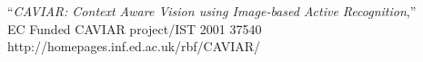 \begin{thebibliography}{9}
	``\textit{CAVIAR: Context Aware Vision using Image-based Active Recognition},''\\
	EC Funded CAVIAR project/IST 2001 37540\\
	http://homepages.inf.ed.ac.uk/rbf/CAVIAR/
	


\end{thebibliography}